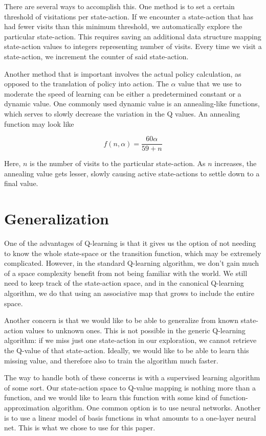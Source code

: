 \documentclass[12pt, letterpaper]{article}
\begin{document}
There are several ways to accomplish this. One method is to set a certain threshold of visitations per state-action. If we encounter a state-action that has had fewer visits than this minimum threshold, we automatically explore the particular state-action. This requires saving an additional data structure mapping state-action values to integers representing number of visits. Every time we visit a state-action, we increment the counter of said state-action.

Another method that is important involves the actual policy calculation, as opposed to the translation of policy into action. The $\alpha$ value that we use to moderate the speed of learning can be either a predetermined constant or a dynamic value. One commonly used dynamic value is an annealing-like functions, which serves to slowly decrease the variation in the Q values. An annealing function may look like

\begin{equation}
    f(n,\alpha) = \frac{60\alpha}{59 + n}
\end{equation}

Here, $n$ is the number of visits to the particular state-action. As $n$ increases, the annealing value gets lesser, slowly causing active state-actions to settle down to a final value.

\section{Generalization}
One of the advantages of Q-learning is that it gives us the option of not needing to know the whole state-space or the transition function, which may be extremely complicated. However, in the standard Q-learning algorithm, we don't gain much of a space complexity benefit from not being familiar with the world. We still need to keep track of the state-action space, and in the canonical Q-learning algorithm, we do that using an associative map that grows to include the entire space.

Another concern is that we would like to be able to generalize from known state-action values to unknown ones. This is not possible in the generic Q-learning algorithm: if we miss just one state-action in our exploration, we cannot retrieve the Q-value of that state-action. Ideally, we would like to be able to learn this missing value, and therefore also to train the algorithm much faster. 

The way to handle both of these concerns is with a supervised learning algorithm of some sort. Our state-action space to Q-value mapping is nothing more than a function, and we would like to learn this function with some kind of function-approximation algorithm. One common option is to use neural networks. Another is to use a linear model of basis functions in what amounts to a one-layer neural net. This is what we chose to use for this paper.
\end{document}
